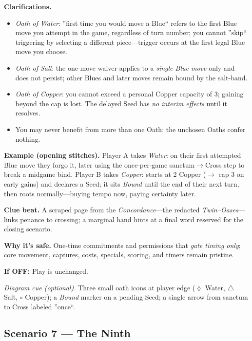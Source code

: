\documentclass[11pt]{article}
\numberwithin{equation}{section} %
\theoremstyle{plain} %
\theoremstyle{definition} %
\theoremstyle{remark} %
\begin{document}
\medskip
\noindent\textbf{Clarifications.}
\begin{itemize}\setlength\itemsep{0.25em}
  \item \textit{Oath of Water}: ''first time you would move a Blue`` refers to the first Blue move you attempt in the game, regardless of turn number; you cannot ''skip`` triggering by selecting a different piece---trigger occurs at the first legal Blue move you choose.
  \item \textit{Oath of Salt}: the one-move waiver applies to a \emph{single Blue move} only and does not persist; other Blues and later moves remain bound by the salt-band.
  \item \textit{Oath of Copper}: you cannot exceed a personal Copper capacity of 3; gaining beyond the cap is lost. The delayed Seed has \emph{no interim effects} until it resolves.
  \item You may never benefit from more than one Oath; the unchosen Oaths confer nothing.
\end{itemize}

\medskip
\noindent\textbf{Example (opening stitches).}  
Player A takes \textit{Water}: on their first attempted Blue move they forgo it, later using the once-per-game sanctum\(\to\)Cross step to break a midgame bind.  
Player B takes \textit{Copper}: starts at 2 Copper (\( \to \) cap 3 on early gains) and declares a Seed; it sits \emph{Bound} until the end of their next turn, then roots normally---buying tempo now, paying certainty later.

\medskip
\noindent\textbf{Clue beat.} A scraped page from the \emph{Concordance}---the redacted \emph{Twin--Oases}---links penance to crossing; a marginal hand hints at a final word reserved for the closing scenario.

\medskip
\noindent\textbf{Why it's safe.} One-time commitments and permissions that \emph{gate timing only}; core movement, captures, costs, specials, scoring, and timers remain pristine.

\medskip
\noindent\textbf{If \textsc{OFF}:} Play is unchanged.

\medskip
\noindent\textit{Diagram cue (optional).} Three small oath icons at player edge (\(\lozenge\) Water, \(\triangle\) Salt, \(\circ\) Copper); a \emph{Bound} marker on a pending Seed; a single arrow from sanctum to Cross labeled ''once``.

\subsection{Scenario 7 --- The Ninth}
\label{scen:the-ninth}
\end{document}
